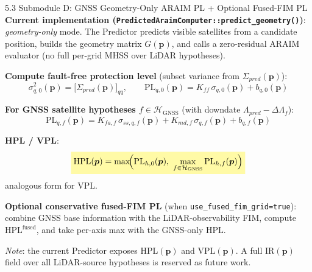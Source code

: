 \documentclass[10pt,aspectratio=169,xcolor=dvipsnames]{beamer}
\newcommand{\PL}{\mathrm{PL}}
\newcommand{\HPL}{\mathrm{HPL}}
\newcommand{\VPL}{\mathrm{VPL}}
\newcommand{\IR}{\mathrm{IR}}
\newcommand{\1}{\mathbb{1}}
\newcommand{\Hset}{\mathcal{H}}
\newcommand{\hlb}[1]{\colorbox{yellow!35}{\(\displaystyle #1\)}}
\begin{document}
\begin{frame}{5.3 Submodule D: GNSS Geometry-Only ARAIM PL + Optional Fused-FIM PL}
  \small
  \textbf{Current implementation (\texttt{PredictedAraimComputer::predict\_geometry()})}: \emph{geometry-only} mode.
  The Predictor predicts visible satellites from a candidate position, builds the geometry matrix $G(\bm{p})$, and calls a zero-residual ARAIM evaluator (no full per-grid MHSS over LiDAR hypotheses).

  \medskip
  \textbf{Compute fault-free protection level} (subset variance from $\Sigma_{pred}(\bm{p})$):
  \[
    \sigma_{q,0}^2(\bm{p})=\bigl[\Sigma_{pred}(\bm{p})\bigr]_{qq},\qquad
    \PL_{q,0}(\bm{p})=K_{ff}\,\sigma_{q,0}(\bm{p})+b_{q,0}(\bm{p})
  \]

  \textbf{For GNSS satellite hypotheses $f\in\Hset_{\mathrm{GNSS}}$} (with downdate $\Lambda_{pred}-\Delta\Lambda_f$):
  \[
    \PL_{q,f}(\bm{p})=K_{fa,f}\,\sigma_{ss,q,f}(\bm{p})+K_{md,f}\,\sigma_{q,f}(\bm{p})+b_{q,f}(\bm{p})
  \]

  \textbf{HPL / VPL}:
  \[
    \hlb{
      \HPL(\bm{p})=\max\!\Bigl(\PL_{h,0}(\bm{p}),\ \max_{f\in\Hset_{\mathrm{GNSS}}}\PL_{h,f}(\bm{p})\Bigr)
    }
  \]
  analogous form for $\VPL$.

  \medskip
  \textbf{Optional conservative fused-FIM PL} (when \texttt{use\_fused\_fim\_grid=true}): combine GNSS base information with the LiDAR-observability FIM, compute $\HPL^{\mathrm{fused}}$, and take per-axis max with the GNSS-only $\HPL$.

  \footnotesize
  \emph{Note}: the current Predictor exposes $\HPL(\bm{p})$ and $\VPL(\bm{p})$. A full $\IR(\bm{p})$ field over all LiDAR-source hypotheses is reserved as future work.
\end{frame}
\end{document}
